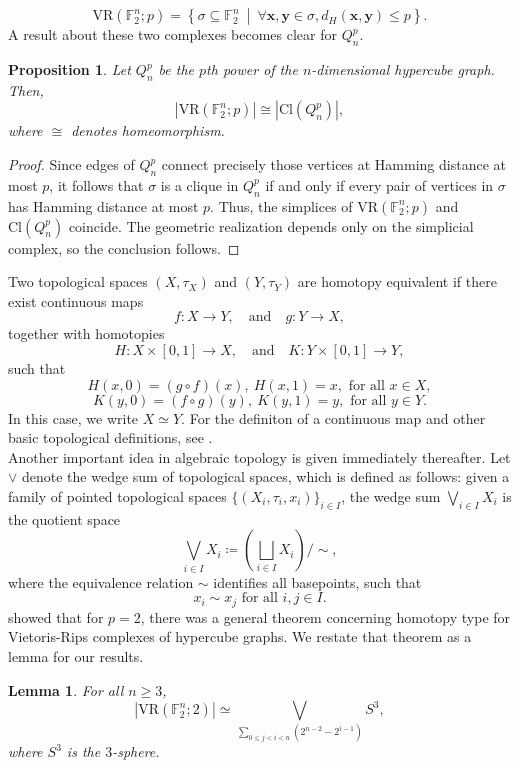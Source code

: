 \documentclass[12pt]{amsart}
\numberwithin{figure}{section}
\theoremstyle{plain}
\newtheorem{proposition}[theorem]{Proposition}
\newtheorem{lemma}[theorem]{Lemma}
\begin{document}
\[\mathrm{VR}(\mathbb{F}_{2}^{n};p) = \left\{\sigma\subseteq\mathbb{F}_{2}^{n}\:\middle|\:\forall\mathbf{x},\mathbf{y}\in\sigma, d_{H}(\mathbf{x},\mathbf{y})\leq p\right\}.\]
A result about these two complexes becomes clear for $Q_{n}^{p}$.
\begin{proposition}
    Let $Q_{n}^{p}$ be the $p$th power of the $n$-dimensional hypercube graph. Then,
    \[|\mathrm{VR}(\mathbb{F}_{2}^{n};p)| \cong |\mathrm{Cl}(Q_{n}^{p})|,\]
    where $\cong$ denotes homeomorphism.
\end{proposition}
\begin{proof}
    Since edges of $Q_{n}^{p}$ connect precisely those vertices at Hamming distance at most $p$, it follows that $\sigma$ is a clique in $Q_{n}^{p}$ if and only if every pair of vertices in $\sigma$ has Hamming distance at most $p$. Thus, the simplices of $\mathrm{VR}(\mathbb{F}_{2}^{n}; p)$ and $\mathrm{Cl}(Q_{n}^{p})$ coincide. The geometric realization depends only on the simplicial complex, so the conclusion follows.
\end{proof}
\indent Two topological spaces $(X, \tau_{X})$ and $(Y, \tau_{Y})$ are homotopy equivalent if there exist continuous maps
\[f : X \to Y, \quad \text{and} \quad g : Y \to X,\]
together with homotopies
\[H : X \times [0,1] \to X, \quad \text{and} \quad K : Y \times [0,1] \to Y,\]
such that
\[H(x,0) = (g \circ f)(x), \ H(x,1) = x, \text{ for all } x \in X,\]
\[K(y,0) = (f \circ g)(y), \ K(y,1) = y, \text{ for all } y \in Y.\]
In this case, we write $X \simeq Y$. For the definiton of a continuous map and other basic topological definitions, see \cite{Munkres00}.\\
\indent Another important idea in algebraic topology is given immediately thereafter. Let $\vee$ denote the wedge sum of topological spaces, which is defined as follows: given a family of pointed topological spaces $\{(X_{i}, \tau_{i}, x_{i})\}_{i \in I}$, the wedge sum $\bigvee_{i \in I} X_{i}$ is the quotient space
\[\bigvee_{i \in I} X_{i} \coloneq \left(\bigsqcup_{i \in I} X_{i}\right)\bigg/ \!\sim,\]
where the equivalence relation $\sim$ identifies all basepoints, such that
\[x_{i} \sim x_{j} \text{ for all } i,j \in I.\]
\cite{Adamaszek21} showed that for $p=2$, there was a general theorem concerning homotopy type for Vietoris-Rips complexes of hypercube graphs. We restate that theorem as a lemma for our results.
\begin{lemma}
    For all $n\geq 3$,
    \[|\mathrm{VR}(\mathbb{F}_{2}^{n}; 2)|\simeq \bigvee_{\sum\limits_{0\leq j< i< n}(2^{n-2}-2^{i-1})}S^{3},\]
    where $S^{3}$ is the $3$-sphere.
\end{lemma}
\end{document}
